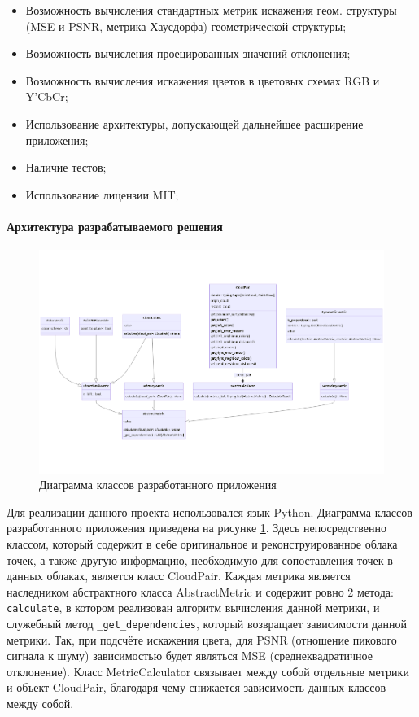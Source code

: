 \documentclass[a4paper,12pt]{extreport}
\begin{document}
\begin{itemize}
    \item Возможность вычисления стандартных метрик искажения геом. структуры (MSE и PSNR,
    метрика Хаусдорфа) геометрической структуры;
    \item Возможность вычисления проецированных значений отклонения;
    \item Возможность вычисления искажения цветов в цветовых схемах RGB и Y'CbCr;
    \item Использование архитектуры, допускающей дальнейшее расширение
    приложения;
    \item Наличие тестов;
    \item Использование лицензии MIT;
\end{itemize}

\paragraph{Архитектура разрабатываемого решения}

\begin{figure}[H]
    \centering
    \includegraphics[width=0.7\linewidth]{assets/classes.png}
    \caption{Диаграмма классов разработанного приложения}
    \label{img:metric_classes}
\end{figure}

Для реализации данного проекта использовался язык Python. Диаграмма классов
разработанного приложения приведена на рисунке \ref{img:metric_classes}. Здесь
непосредственно классом, который содержит в себе оригинальное и
реконструированное облака точек, а также другую информацию, необходимую для
сопоставления точек в данных облаках, является класс CloudPair. Каждая метрика
является наследником абстрактного класса AbstractMetric и содержит ровно 2
метода: \texttt{calculate}, в котором реализован алгоритм вычисления данной
метрики, и служебный метод \texttt{\_get\_dependencies}, который возвращает
зависимости данной метрики. Так, при подсчёте искажения цвета, для PSNR
(отношение пикового сигнала к шуму) зависимостью будет являться MSE
(среднеквадратичное отклонение). Класс MetricCalculator связывает между собой
отдельные метрики и объект CloudPair, благодаря чему снижается зависимость
данных классов между собой.
\end{document}
